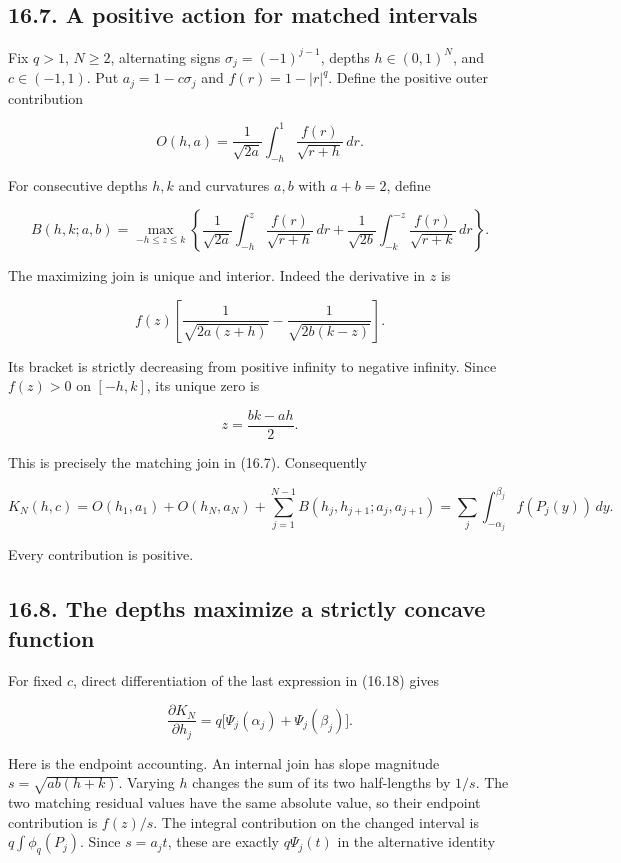 \documentclass[11pt]{article}
\begin{document}
\subsection{16.7. A positive action for matched
intervals}\label{a-positive-action-for-matched-intervals}

Fix \(q>1\), \(N\ge2\), alternating signs \(\sigma_j=(-1)^{j-1}\),
depths \(h\in(0,1)^N\), and \(c\in(-1,1)\). Put \(a_j=1-c\sigma_j\) and
\(f(r)=1-|r|^q\). Define the positive outer contribution

\[
O(h,a)=\frac1{\sqrt{2a}}\int_{-h}^1\frac{f(r)}{\sqrt{r+h}}\,dr.
\tag{16.15}
\]

For consecutive depths \(h,k\) and curvatures \(a,b\) with \(a+b=2\),
define

\[
B(h,k;a,b)=\max_{-h\le z\le k}\left\{
\frac1{\sqrt{2a}}\int_{-h}^z\frac{f(r)}{\sqrt{r+h}}\,dr
+\frac1{\sqrt{2b}}\int_{-k}^{-z}\frac{f(r)}{\sqrt{r+k}}\,dr
\right\}.
\tag{16.16}
\]

The maximizing join is unique and interior. Indeed the derivative in
\(z\) is

\[
f(z)\left[\frac1{\sqrt{2a(z+h)}}-
\frac1{\sqrt{2b(k-z)}}\right].
\]

Its bracket is strictly decreasing from positive infinity to negative
infinity. Since \(f(z)>0\) on \([-h,k]\), its unique zero is

\[
z=\frac{bk-ah}{2}.
\tag{16.17}
\]

This is precisely the matching join in (16.7). Consequently

\[
K_N(h,c)=O(h_1,a_1)+O(h_N,a_N)
+\sum_{j=1}^{N-1}B(h_j,h_{j+1};a_j,a_{j+1})
=\sum_j\int_{-\alpha_j}^{\beta_j}f(P_j(y))\,dy.
\tag{16.18}
\]

Every contribution is positive.

\subsection{16.8. The depths maximize a strictly concave
function}\label{the-depths-maximize-a-strictly-concave-function}

For fixed \(c\), direct differentiation of the last expression in
(16.18) gives

\[
\frac{\partial K_N}{\partial h_j}
=q\bigl[\Psi_j(\alpha_j)+\Psi_j(\beta_j)\bigr].
\tag{16.19}
\]

Here is the endpoint accounting. An internal join has slope magnitude
\(s=\sqrt{ab(h+k)}\). Varying \(h\) changes the sum of its two
half-lengths by \(1/s\). The two matching residual values have the same
absolute value, so their endpoint contribution is \(f(z)/s\). The
integral contribution on the changed interval is \(q\int\phi_q(P_j)\).
Since \(s=a_jt\), these are exactly \(q\Psi_j(t)\) in the alternative
identity
\end{document}
